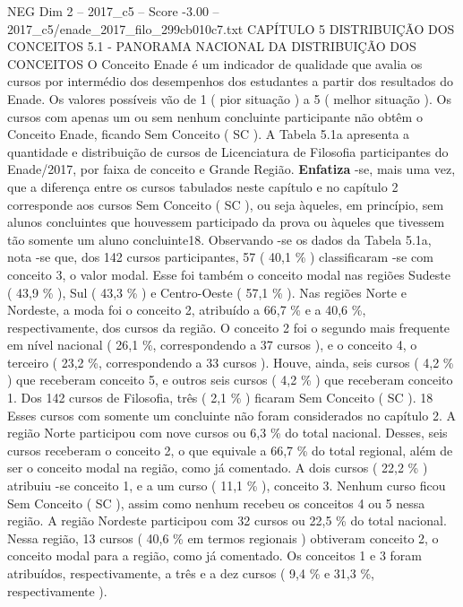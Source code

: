 \begin{textsample}{NEG Dim 2 – 2017\_c5 – Score -3.00 – 2017\_c5/enade\_2017\_filo\_299cb010c7.txt}  \label{ex:f2_neg_047}
CAPÍTULO 5 DISTRIBUIÇÃO DOS CONCEITOS 5.1 - PANORAMA NACIONAL DA DISTRIBUIÇÃO DOS CONCEITOS O Conceito Enade é um indicador de qualidade que avalia os cursos por intermédio dos desempenhos dos estudantes a partir dos resultados do Enade.
Os valores possíveis vão de 1 ( pior situação ) a 5 ( melhor situação ).
Os cursos com apenas um ou sem nenhum concluinte participante não obtêm o Conceito Enade, ficando Sem Conceito ( SC ).
A Tabela 5.1a apresenta a quantidade e distribuição de cursos de Licenciatura de Filosofia participantes do Enade/2017, por faixa de conceito e Grande Região. \textbf{Enfatiza} -se, mais uma vez, que a diferença entre os cursos tabulados neste capítulo e no capítulo 2 corresponde aos cursos Sem Conceito ( SC ), ou seja àqueles, em princípio, sem alunos concluintes que houvessem participado da prova ou àqueles que tivessem tão somente um aluno concluinte18.
Observando -se os dados da Tabela 5.1a, nota -se que, dos 142 cursos participantes, 57 ( 40,1 \% ) classificaram -se com conceito 3, o valor modal.
Esse foi também o conceito modal nas regiões Sudeste ( 43,9 \% ), Sul ( 43,3 \% ) e Centro-Oeste ( 57,1 \% ).
Nas regiões Norte e Nordeste, a moda foi o conceito 2, atribuído a 66,7 \% e a 40,6 \%, respectivamente, dos cursos da região.
O conceito 2 foi o segundo mais frequente em nível nacional ( 26,1 \%, correspondendo a 37 cursos ), e o conceito 4, o terceiro ( 23,2 \%, correspondendo a 33 cursos ).
Houve, ainda, seis cursos ( 4,2 \% ) que receberam conceito 5, e outros seis cursos ( 4,2 \% ) que receberam conceito 1.
Dos 142 cursos de Filosofia, três ( 2,1 \% ) ficaram Sem Conceito ( SC ). 18 Esses cursos com somente um concluinte não foram considerados no capítulo 2.
A região Norte participou com nove cursos ou 6,3 \% do total nacional.
Desses, seis cursos receberam o conceito 2, o que equivale a 66,7 \% do total regional, além de ser o conceito modal na região, como já comentado.
A dois cursos ( 22,2 \% ) atribuiu -se conceito 1, e a um curso ( 11,1 \% ), conceito 3.
Nenhum curso ficou Sem Conceito ( SC ), assim como nenhum recebeu os conceitos 4 ou 5 nessa região.
A região Nordeste participou com 32 cursos ou 22,5 \% do total nacional.
Nessa região, 13 cursos ( 40,6 \% em termos regionais ) obtiveram conceito 2, o conceito modal para a região, como já comentado.
Os conceitos 1 e 3 foram atribuídos, respectivamente, a três e a dez cursos ( 9,4 \% e 31,3 \%, respectivamente ).

\end{textsample}
